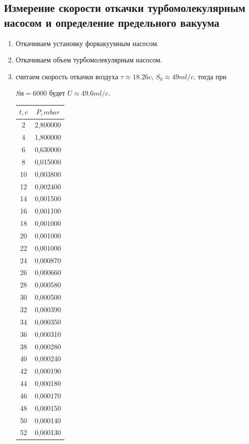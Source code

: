 \documentclass[a4paper, 12pt]{article}%
\begin{document}
\subsection*{Измерение скорости откачки турбомолекулярным насосом и определение предельного вакуума}
\begin{enumerate}
\item Откачиваем установку форвакуумным насосом.
\item Откачиваем объем турбомолекулярным насосом.
\item считаем скорость откачки воздуха $\tau \approx 18.26 c$, $S_0 \approx 49 ml/c$, тогда при

$Sн = 6000$ будет $U \approx 49.6 ml/c$.
\newline
\begin{tabular}{|c|c|}
\hline
$t, c$ & $P, mbar$ \\ \hline
2 & 2,800000 \\ \hline
4 & 1,800000 \\ \hline
6 & 0,630000 \\ \hline
8 & 0,015000 \\ \hline
10 & 0,003800 \\ \hline
12 & 0,002400 \\ \hline
14 & 0,001500 \\ \hline
16 & 0,001100 \\ \hline
18 & 0,001000 \\ \hline
20 & 0,001000 \\ \hline
22 & 0,001000 \\ \hline
24 & 0,000870 \\ \hline
26 & 0,000660 \\ \hline
28 & 0,000580 \\ \hline
30 & 0,000500 \\ \hline
32 & 0,000390 \\ \hline
34 & 0,000350 \\ \hline
36 & 0,000310 \\ \hline
38 & 0,000280 \\ \hline
40 & 0,000240 \\ \hline
42 & 0,000190 \\ \hline
44 & 0,000180 \\ \hline
46 & 0,000170 \\ \hline
48 & 0,000150 \\ \hline
50 & 0,000140 \\ \hline
52 & 0,000130 \\ \hline

\end{tabular}
\end{enumerate}
\end{document}
